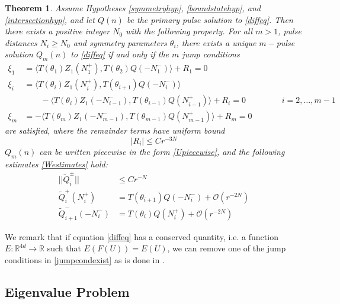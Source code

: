 \documentclass[12pt]{article}
\def\R{{\mathbb R}}
\newtheorem{theorem}{Theorem}
\begin{document}
\begin{theorem}\label{ntmulti}
Assume Hypotheses \ref{symmetryhyp}, \ref{boundstatehyp}, and \ref{intersectionhyp}, and let $Q(n)$ be the primary pulse solution to \eqref{diffeq}. Then there exists a positive  integer $N_0$ with the following property. For all $m > 1$, pulse distances $N_i \geq N_0$ and symmetry parameters $\theta_i$, there exists a unique $m-$pulse solution $Q_m(n)$ to \eqref{diffeq} if and only if the $m$ jump conditions 
\begin{equation}\label{jumpcondexist}
\begin{aligned}
\xi_1 &= \langle T(\theta_1) Z_1(N_1^+), T(\theta_{2}) Q(-N_1^-) \rangle + R_1 = 0 \\
\xi_i &= \langle T(\theta_i) Z_1(N_i^+), T(\theta_{i+1}) Q(-N_i^-) \rangle \\
&\qquad-\langle T(\theta_i) Z_1(-N_{i-1}^-), T(\theta_{i-1}) Q(N_{i-1}^+) \rangle + R_i = 0 && \qquad i = 2, \dots, m-1 \\
\xi_m &= -\langle T(\theta_m) Z_1(-N_{m-1}^-), T(\theta_{m-1}) Q(N_{m-1}^+) \rangle + R_m = 0
\end{aligned}
\end{equation}
are satisfied, where the remainder terms have uniform bound
\[
|R_i| \leq C r^{-3N}
\]
$Q_m(n)$ can be written piecewise in the form \eqref{Upiecewise}, and the following estimates \eqref{Westimates} hold:
\begin{equation}\label{Westimates}
\begin{aligned}
||\tilde{Q}_i^\pm|| &\leq C r^{-N} \\
\tilde{Q}_i^+(N_i^+) &= T(\theta_{i+1}) Q(-N_i^-) + \mathcal{O}(r^{-2N}) \\
\tilde{Q}_{i+1}^-(-N_i^-) &= T(\theta_i) Q(N_i^+) + \mathcal{O}(r^{-2N})
\end{aligned}
\end{equation}
\end{theorem}

\noindent We remark that if equation \eqref{diffeq} has a conserved quantity, i.e. a function $E: \R^{4d} \rightarrow \R$ such that $E(F(U)) = E(U)$, we can remove one of the jump conditions in \eqref{jumpcondexist} as is done in \cite{SandstedeStrut}.

\subsection{Eigenvalue Problem}
\end{document}
